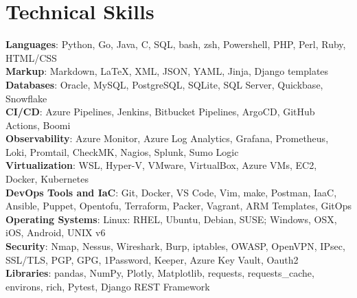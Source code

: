 \section{Technical Skills}
 \begin{itemize}[leftmargin=0.15in, label={}]
    \small{\item{
     \textbf{Languages}{: Python, Go, Java, C, SQL, bash, zsh, Powershell, PHP, Perl, Ruby, HTML/CSS} \\
     \textbf{Markup}{: Markdown, LaTeX, XML, JSON, YAML, Jinja, Django templates} \\
     \textbf{Databases}{: Oracle, MySQL, PostgreSQL, SQLite, SQL Server, Quickbase, Snowflake} \\
     \textbf{CI/CD}{: Azure Pipelines, Jenkins, Bitbucket Pipelines, ArgoCD, GitHub Actions, Boomi} \\
     \textbf{Observability}{: Azure Monitor, Azure Log Analytics, Grafana, Prometheus, Loki, Promtail, CheckMK, Nagios, Splunk, Sumo Logic} \\
     \textbf{Virtualization}{: WSL, Hyper-V, VMware, VirtualBox, Azure VMs, EC2, Docker, Kubernetes} \\
     \textbf{DevOps Tools and IaC}{: Git, Docker, VS Code, Vim, make, Postman, IaaC, Ansible, Puppet, Opentofu, Terraform, Packer, Vagrant, ARM Templates, GitOps} \\
     \textbf{Operating Systems}{: Linux: RHEL, Ubuntu, Debian, SUSE; Windows, OSX, iOS, Android, UNIX v6} \\
     \textbf{Security}{: Nmap, Nessus, Wireshark, Burp, iptables, OWASP, OpenVPN, IPsec, SSL/TLS, PGP, GPG, 1Password, Keeper, Azure Key Vault, Oauth2} \\
     \textbf{Libraries}{: pandas, NumPy, Plotly, Matplotlib, requests, requests\_cache, environs, rich, Pytest, Django REST Framework} \\
    }}
 \end{itemize}
